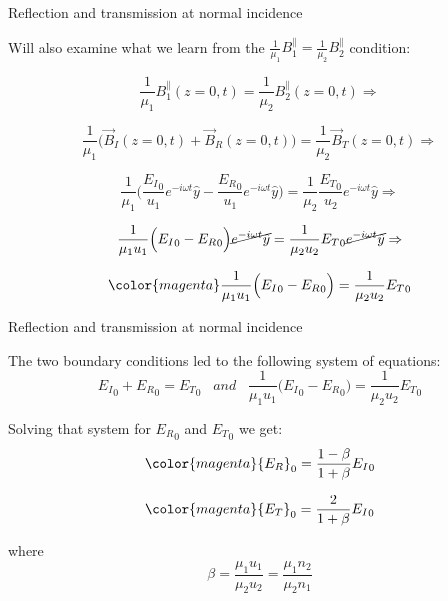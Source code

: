 \begin{frame}{Reflection and transmission at normal incidence}

Will also examine what we learn from the
$\frac{1}{\mu_1} B_1^{\parallel} = \frac{1}{\mu_2} B_2^{\parallel}$ condition:

\begin{equation*}
    \frac{1}{\mu_1} B_1^{\parallel}(z=0, t) = \frac{1}{\mu_2} B_2^{\parallel}(z=0, t) \Rightarrow
\end{equation*}

\begin{equation*}
    \frac{1}{\mu_1} \Big( \vec{B}_I(z=0, t) + \vec{B}_R(z=0, t) \Big) = \frac{1}{\mu_2} \vec{B}_T(z=0, t) \Rightarrow
\end{equation*}

\begin{equation*}
    \frac{1}{\mu_1}
      \Big( \frac{{E_I}_0}{u_1}   e^{-i \omega t} \hat{y}
             -\frac{{E_R}_0}{u_1}  e^{-i \omega t} \hat{y}
       \Big) = \frac{1}{\mu_2} \frac{{E_T}_0}{u_2}  e^{-i \omega t} \hat{y} \Rightarrow
\end{equation*}

\begin{equation*}
    \frac{1}{\mu_1 u_1} \Big( {E_I}_0 - {E_R}_0 \Big) \cancel{e^{-i \omega t} \hat{y}} =
    \frac{1}{\mu_2 u_2}  {E_T}_0  \cancel{e^{-i \omega t} \hat{y}} \Rightarrow
\end{equation*}

\begin{equation*}
    {\color{magenta}
      \frac{1}{\mu_1 u_1} \Big( {E_I}_0 - {E_R}_0 \Big) = \frac{1}{\mu_2 u_2}  {E_T}_0
    }
\end{equation*}

\end{frame}

%
%
%

\begin{frame}{Reflection and transmission at normal incidence}

The two boundary conditions led to the following system of equations:
\begin{equation*}
   {E_I}_0  +  {E_R}_0  = {E_T}_0  \;\;\; and \;\;\;
   \frac{1}{\mu_1 u_1} \Big( {E_I}_0 - {E_R}_0 \Big) = \frac{1}{\mu_2 u_2}  {E_T}_0
\end{equation*}

Solving that system for ${E_R}_0$ and ${E_T}_0$ we get:
\begin{equation*}
    {\color{magenta}
         {E_R}_0 = \frac{1-\beta}{1+\beta} {E_I}_0
    }
\end{equation*}

\begin{equation*}
    {\color{magenta}
         {E_T}_0 = \frac{2}{1+\beta} {E_I}_0
    }
\end{equation*}

where
\begin{equation*}
  \beta = \frac{\mu_1 u_1}{\mu_2 u_2} = \frac{\mu_1 n_2}{\mu_2 n_1}
\end{equation*}

\end{frame}

